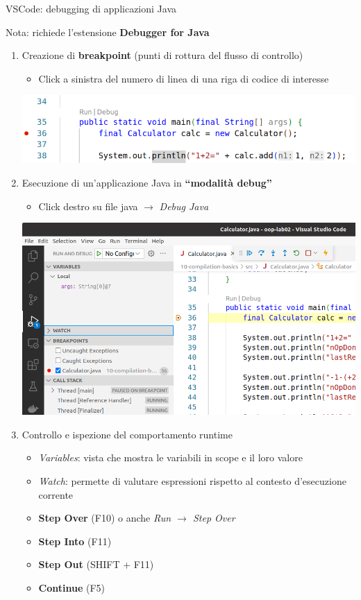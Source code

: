 \documentclass[xcolor=dvipsnames,presentation]{beamer}
\begin{document}
\begin{frame}[allowframebreaks]{VSCode: debugging di applicazioni Java}

Nota: richiede l'estensione \textbf{Debugger for Java}

\begin{enumerate}
\item Creazione di \textbf{breakpoint} (punti di rottura del flusso di controllo)
	\begin{itemize}
	\item Click a sinistra del numero di linea di una riga di codice di interesse
	\end{itemize}
 {\centering
 \includegraphics[height=0.15\textheight]{img/vscode-example-breakpoint2.png}
 }
\item Esecuzione di un'applicazione Java in \textbf{``modalità debug''}
	\begin{itemize}
	\item Click destro su file java $\to$ \emph{Debug Java}
	\end{itemize}
 {\centering
 \includegraphics[height=0.4\textheight]{img/vscode-example-debug.png}
 }
\item Controllo e ispezione del comportamento runtime
	\begin{itemize}
	\item \emph{Variables}: vista che mostra le variabili in scope e il loro valore
	\item \emph{Watch}: permette di valutare espressioni rispetto al contesto d'esecuzione corrente
	\item \textbf{Step Over} (F10) o anche \emph{Run $\to$ Step Over}
	\item \textbf{Step Into} (F11)
	\item \textbf{Step Out} (SHIFT + F11)
	\item \textbf{Continue} (F5)
	\end{itemize}
\end{enumerate}

\end{frame}
\end{document}

